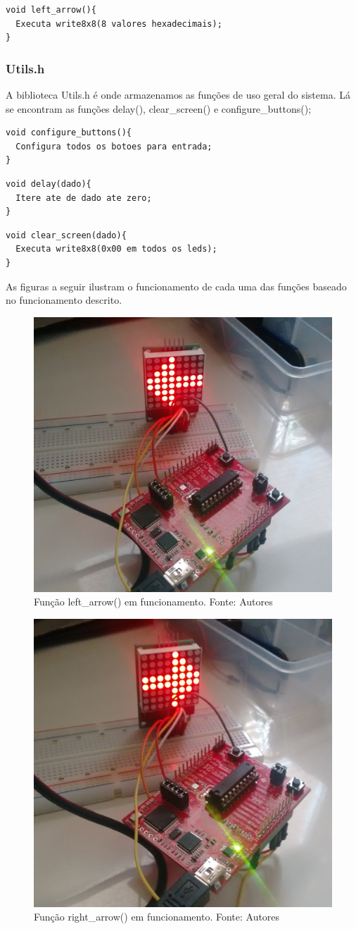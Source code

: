 \documentclass[conference]{IEEEtran}
\begin{document}
\begin{lstlisting}
void left_arrow(){
  Executa write8x8(8 valores hexadecimais);
}
\end{lstlisting}

\subsubsection{Utils.h}
A biblioteca Utils.h é onde armazenamos as funções de uso geral do sistema. Lá
se encontram as funções delay(), clear\_screen() e configure\_buttons();
\begin{lstlisting}
void configure_buttons(){
  Configura todos os botoes para entrada;
}
\end{lstlisting}

\begin{lstlisting}
void delay(dado){
  Itere ate de dado ate zero;
}
\end{lstlisting}

\begin{lstlisting}
void clear_screen(dado){
  Executa write8x8(0x00 em todos os leds);
}
\end{lstlisting}

As figuras a seguir ilustram o funcionamento de cada uma das funções baseado no funcionamento descrito.

\begin{figure}[H]
  \centering
  \includegraphics[width=0.5\linewidth]{esq}
  \caption{Função left\_arrow() em funcionamento. Fonte: Autores}
  \label{fig:esq}
\end{figure}

\begin{figure}[H]
  \centering
  \includegraphics[width=0.5\linewidth]{dir}
  \caption{Função right\_arrow() em funcionamento. Fonte: Autores}
  \label{fig:dir}
\end{figure}
\end{document}
